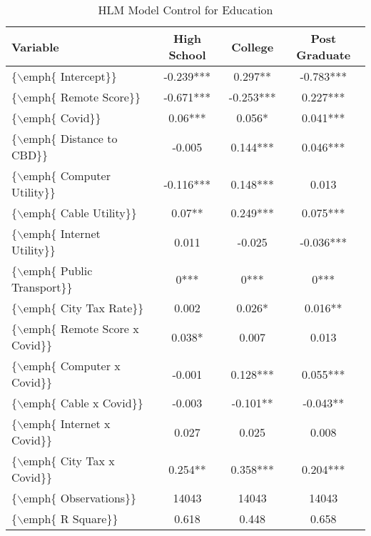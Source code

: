\begin{table}[ht]
\centering
\begin{tabular}{|l|c|c|c|}
  \hline
Variable & High School & College & Post Graduate \\ 
  \hline
\{$\backslash$emph\{ Intercept\}\} & -0.239*** & 0.297** & -0.783*** \\ 
  \{$\backslash$emph\{ Remote Score\}\} & -0.671*** & -0.253*** & 0.227*** \\ 
  \{$\backslash$emph\{ Covid\}\} & 0.06*** & 0.056* & 0.041*** \\ 
  \{$\backslash$emph\{ Distance to CBD\}\} & -0.005 & 0.144*** & 0.046*** \\ 
  \{$\backslash$emph\{ Computer Utility\}\} & -0.116*** & 0.148*** & 0.013 \\ 
  \{$\backslash$emph\{ Cable Utility\}\} & 0.07** & 0.249*** & 0.075*** \\ 
  \{$\backslash$emph\{ Internet Utility\}\} & 0.011 & -0.025 & -0.036*** \\ 
  \{$\backslash$emph\{ Public Transport\}\} & 0*** & 0*** & 0*** \\ 
  \{$\backslash$emph\{ City Tax Rate\}\} & 0.002 & 0.026* & 0.016** \\ 
  \{$\backslash$emph\{ Remote Score x Covid\}\} & 0.038* & 0.007 & 0.013 \\ 
  \{$\backslash$emph\{ Computer x Covid\}\} & -0.001 & 0.128*** & 0.055*** \\ 
  \{$\backslash$emph\{ Cable x Covid\}\} & -0.003 & -0.101** & -0.043** \\ 
   \hline\hline
\{$\backslash$emph\{ Internet x Covid\}\} & 0.027 & 0.025 & 0.008 \\ 
  \{$\backslash$emph\{ City Tax x Covid\}\} & 0.254** & 0.358*** & 0.204*** \\ 
  \{$\backslash$emph\{ Observations\}\} & 14043 & 14043 & 14043 \\ 
  \{$\backslash$emph\{ R Square\}\} & 0.618 & 0.448 & 0.658 \\ 
   \hline
\end{tabular}
\caption{HLM Model Control for Education} 
\end{table}
